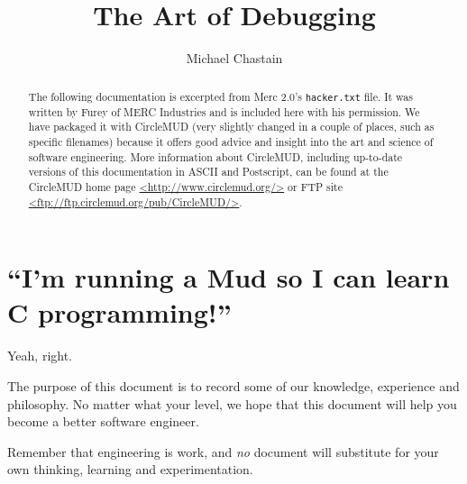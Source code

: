 \documentclass{article}
\title{The Art of Debugging}
\author{Michael Chastain}
\begin{document}
\maketitle

\begin{abstract}
The following documentation is excerpted from Merc 2.0's \texttt{hacker.txt} file.  It was written by Furey of MERC Industries and is included here with his permission.  We have packaged it with CircleMUD (very slightly changed in a couple of places, such as specific filenames) because it offers good advice and insight into the art and science of software engineering.  More information about CircleMUD, including up-to-date versions of this documentation in ASCII and Postscript, can be found at the CircleMUD home page \url{<http://www.circlemud.org/>} or FTP site \url{<ftp://ftp.circlemud.org/pub/CircleMUD/>}.
\end{abstract}

\section{``I'm running a Mud so I can learn C programming!''}
Yeah, right.
\par
The purpose of this document is to record some of our knowledge, experience and philosophy.  No matter what your level, we hope that this document will help you become a better software engineer.
\par
Remember that engineering is work, and {\em no} document will substitute for your own thinking, learning and experimentation.
\end{document}
